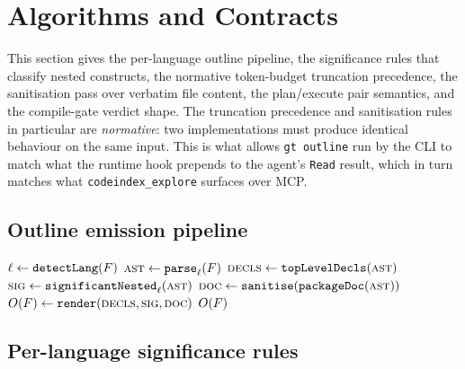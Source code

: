 \section{Algorithms and Contracts}
\label{sec:algorithm}

This section gives the per-language outline pipeline, the significance
rules that classify nested constructs, the normative token-budget
truncation precedence, the sanitisation pass over verbatim file content,
the plan/execute pair semantics, and the compile-gate verdict shape.
The truncation precedence and sanitisation rules in particular are
\emph{normative}: two implementations must produce identical behaviour
on the same input. This is what allows \texttt{gt outline} run by the
CLI to match what the runtime hook prepends to the agent's
\texttt{Read} result, which in turn matches what
\texttt{codeindex\_explore} surfaces over MCP.

\subsection{Outline emission pipeline}
\label{sec:algorithm:pipeline}

\begin{algorithm}[H]
$\ell \leftarrow \texttt{detectLang}(F)$\;
$\textsc{ast} \leftarrow \texttt{parse}_\ell(F)$\;
$\textsc{decls} \leftarrow \texttt{topLevelDecls}(\textsc{ast})$\;
$\textsc{sig} \leftarrow \texttt{significantNested}_\ell(\textsc{ast})$\;
$\textsc{doc} \leftarrow \texttt{sanitise}(\texttt{packageDoc}(\textsc{ast}))$\;
$O(F) \leftarrow \texttt{render}(\textsc{decls}, \textsc{sig}, \textsc{doc})$\;
\Return $O(F)$\;
\caption{The outline emission pipeline. \texttt{render} produces
  Markdown matching the schema in \cref{app:schema}.}
\label{alg:outline}
\end{algorithm}

\subsection{Per-language significance rules}
\label{sec:algorithm:significance}

